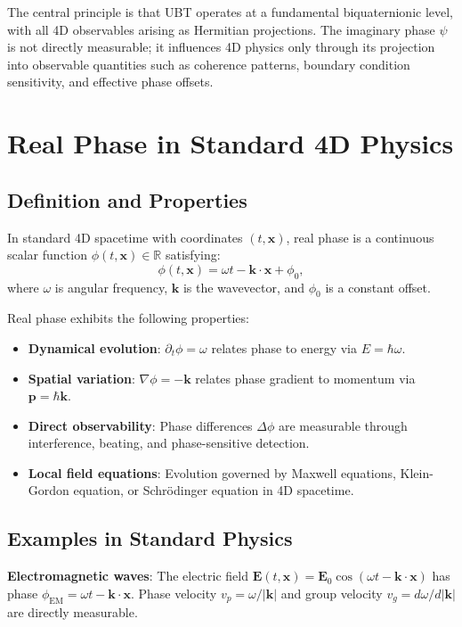 \documentclass[12pt]{article}
\begin{document}
The central principle is that UBT operates at a fundamental biquaternionic level, with all 4D observables arising as Hermitian projections. The imaginary phase $\psi$ is not directly measurable; it influences 4D physics only through its projection into observable quantities such as coherence patterns, boundary condition sensitivity, and effective phase offsets.

\section{Real Phase in Standard 4D Physics}

\subsection{Definition and Properties}

In standard 4D spacetime with coordinates $(t, \mathbf{x})$, real phase is a continuous scalar function $\phi(t, \mathbf{x}) \in \mathbb{R}$ satisfying:
\begin{equation}
\phi(t, \mathbf{x}) = \omega t - \mathbf{k} \cdot \mathbf{x} + \phi_0,
\label{eq:real_phase}
\end{equation}
where $\omega$ is angular frequency, $\mathbf{k}$ is the wavevector, and $\phi_0$ is a constant offset.

Real phase exhibits the following properties:
\begin{itemize}
\item \textbf{Dynamical evolution}: $\partial_t \phi = \omega$ relates phase to energy via $E = \hbar\omega$.
\item \textbf{Spatial variation}: $\nabla \phi = -\mathbf{k}$ relates phase gradient to momentum via $\mathbf{p} = \hbar\mathbf{k}$.
\item \textbf{Direct observability}: Phase differences $\Delta\phi$ are measurable through interference, beating, and phase-sensitive detection.
\item \textbf{Local field equations}: Evolution governed by Maxwell equations, Klein-Gordon equation, or Schrödinger equation in 4D spacetime.
\end{itemize}

\subsection{Examples in Standard Physics}

\textbf{Electromagnetic waves}: The electric field $\mathbf{E}(t, \mathbf{x}) = \mathbf{E}_0 \cos(\omega t - \mathbf{k} \cdot \mathbf{x})$ has phase $\phi_{\text{EM}} = \omega t - \mathbf{k} \cdot \mathbf{x}$. Phase velocity $v_p = \omega/|\mathbf{k}|$ and group velocity $v_g = d\omega/d|\mathbf{k}|$ are directly measurable.
\end{document}
